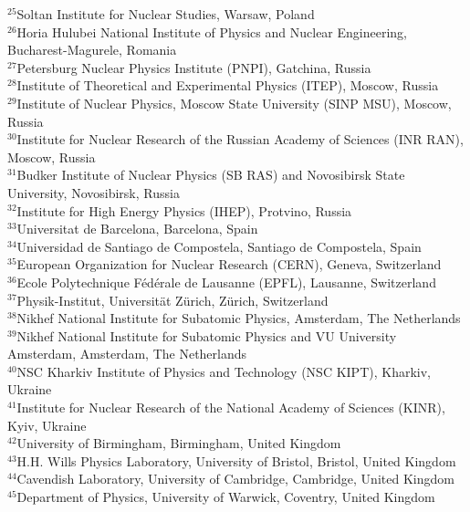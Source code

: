 \documentclass[12pt,a4paper]{article}
\begin{document}
\begin{titlepage}
\begin{center}
\begin{flushleft}
{$ ^{25}$Soltan Institute for Nuclear Studies, Warsaw, Poland\\
$ ^{26}$Horia Hulubei National Institute of Physics and Nuclear Engineering, Bucharest-Magurele, Romania\\
$ ^{27}$Petersburg Nuclear Physics Institute (PNPI), Gatchina, Russia\\
$ ^{28}$Institute of Theoretical and Experimental Physics (ITEP), Moscow, Russia\\
$ ^{29}$Institute of Nuclear Physics, Moscow State University (SINP MSU), Moscow, Russia\\
$ ^{30}$Institute for Nuclear Research of the Russian Academy of Sciences (INR RAN), Moscow, Russia\\
$ ^{31}$Budker Institute of Nuclear Physics (SB RAS) and Novosibirsk State University, Novosibirsk, Russia\\
$ ^{32}$Institute for High Energy Physics (IHEP), Protvino, Russia\\
$ ^{33}$Universitat de Barcelona, Barcelona, Spain\\
$ ^{34}$Universidad de Santiago de Compostela, Santiago de Compostela, Spain\\
$ ^{35}$European Organization for Nuclear Research (CERN), Geneva, Switzerland\\
$ ^{36}$Ecole Polytechnique F\'{e}d\'{e}rale de Lausanne (EPFL), Lausanne, Switzerland\\
$ ^{37}$Physik-Institut, Universit\"{a}t Z\"{u}rich, Z\"{u}rich, Switzerland\\
$ ^{38}$Nikhef National Institute for Subatomic Physics, Amsterdam, The Netherlands\\
$ ^{39}$Nikhef National Institute for Subatomic Physics and VU University Amsterdam, Amsterdam, The Netherlands\\
$ ^{40}$NSC Kharkiv Institute of Physics and Technology (NSC KIPT), Kharkiv, Ukraine\\
$ ^{41}$Institute for Nuclear Research of the National Academy of Sciences (KINR), Kyiv, Ukraine\\
$ ^{42}$University of Birmingham, Birmingham, United Kingdom\\
$ ^{43}$H.H. Wills Physics Laboratory, University of Bristol, Bristol, United Kingdom\\
$ ^{44}$Cavendish Laboratory, University of Cambridge, Cambridge, United Kingdom\\
$ ^{45}$Department of Physics, University of Warwick, Coventry, United Kingdom\\
}
\end{flushleft}
\end{center}
\end{titlepage}
\end{document}
